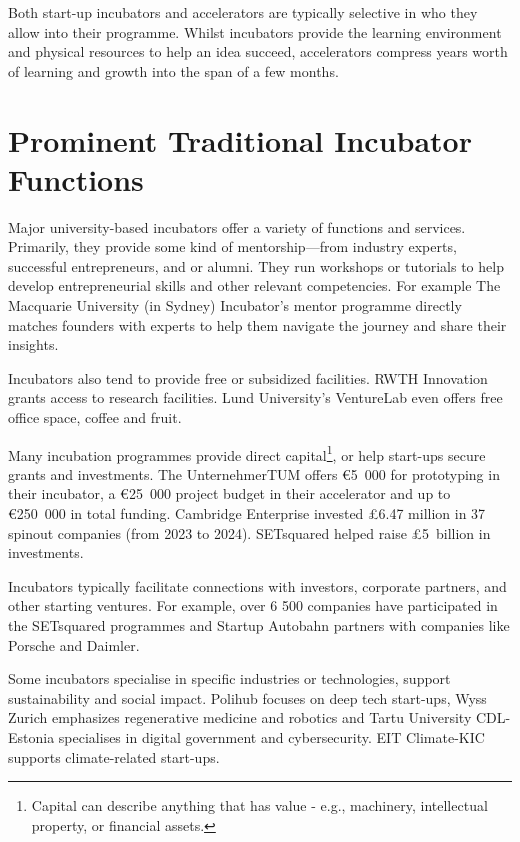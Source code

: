 Both start-up incubators and accelerators are typically selective in who they allow into their programme. Whilst incubators provide the learning environment and physical resources to help an idea succeed, accelerators compress years worth of learning and growth into the span of a few months.
\cite{harward-incub-accelerator}

\section{Prominent Traditional Incubator Functions}
Major university-based incubators offer a variety of functions and services. Primarily, they provide some kind of mentorship---from industry experts, successful entrepreneurs, and or alumni. They run workshops or tutorials to help develop entrepreneurial skills and other relevant competencies. For example The Macquarie University (in Sydney) Incubator’s mentor programme directly matches founders with experts to help them navigate the journey and share their insights.
\cite{Bonenkamp_incubators, Macquarie-incubation}

Incubators also tend to provide free or subsidized facilities. RWTH Innovation grants access to research facilities. Lund University’s VentureLab even offers free office space, coffee and fruit.
\cite{rth-innovation, lund-incubator}

Many incubation programmes provide direct capital\footnote{Capital can describe anything that has value - e.g., machinery, intellectual property, or financial assets.}, or help start-ups secure grants and investments. The UnternehmerTUM offers €5~000 for prototyping in their incubator, a €25~000 project budget in their accelerator and up to €250~000 in total funding. Cambridge Enterprise invested £6.47 million in 37 spinout companies (from 2023 to 2024). SETsquared helped raise £5~billion in investments.
\cite{unternehmertum, cambridge-venture, setsquared}

Incubators typically facilitate connections with investors, corporate partners, and other starting ventures. For example, over 6 500 companies have participated in the SETsquared programmes and Startup Autobahn partners with companies like Porsche and Daimler.
\cite{setsquared, autobahn}

Some incubators specialise in specific industries or technologies, support sustainability and social impact. Polihub focuses on deep tech start-ups, Wyss Zurich emphasizes regenerative medicine and robotics and Tartu University CDL-Estonia specialises in digital government and cybersecurity. EIT Climate-KIC supports climate-related start-ups.
\cite{polihub, wyss-zurich, estonia-creative-destruction, climate-strategy}

